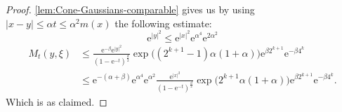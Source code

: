 \documentclass[a4paper,oneside,10pt]{amsproc}
\theoremstyle{plain}
\theoremstyle{remark}
\renewcommand{\leq}{\leqslant}
\renewcommand{\leq}{\leqslant}
\newcommand{\e}{\mathrm{e}} %
\renewcommand{\leq}{\leqslant}%
\begin{document}
\begin{proof}
\autoref{lem:Cone-Gaussians-comparable} gives us
  by using $|x - y| \leq \alpha t \leq \alpha^2 m(x)$ the following estimate:
  \begin{equation*}
 \e^{|y|^2} \leq \e^{|x|^2}  \e^{\alpha^4} \e^{2\alpha^2}
  \end{equation*}
    \begin{align*}
    M_t(y, \xi) &\leq \frac{\e^{-\beta} \e^{|y|^2}}{(1 - \e^{-t})^{\frac{d}2}}
    \exp\bigl((2^{k + 1} - 1) \alpha (1 + \alpha) \bigr) \e^{\beta
      2^{k + 1}} \e^{-\beta 4^k}\\
    &\leq \e^{-(\alpha + \beta)} \e^{\alpha^4} \e^{\alpha^2} \frac{ \e^{|x|^2} }{(1 - \e^{-t})^{\frac{d}2}}
    \exp\bigl(2^{k + 1} \alpha (1 + \alpha) \bigr)  \e^{\beta 2^{k + 1}} \e^{-\beta 4^k}.
  \end{align*}
  Which is as claimed.
\end{proof}
\end{document}
